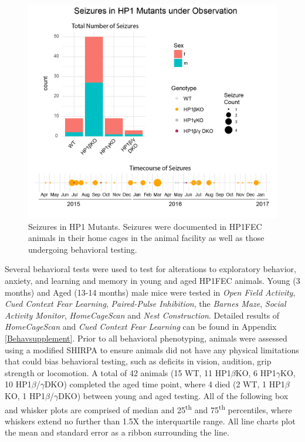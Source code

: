 \documentclass[onehalf,12pt]{beavtex}
\begin{document}
  \begin{figure}
  
  {\centering \includegraphics[width=1\linewidth, ]{./figure/results/seizures} 
  
  }
  
  \caption[Seizures in HP1 Mutants]{Seizures in HP1 Mutants.  Seizures were documented in HP1FEC animals in their home cages in the animal facility as well as those undergoing behavioral testing. }\label{fig:seizures}
  \end{figure}
  
  Several behavioral tests were used to test for alterations to
  exploratory behavior, anxiety, and learning and memory in young and aged
  HP1FEC animals. Young (3 months) and Aged (13-14 months) male mice were
  tested in \emph{Open Field Activity}, \emph{Cued Context Fear Learning},
  \emph{Paired-Pulse Inhibition}, the \emph{Barnes Maze}, \emph{Social
  Activity Monitor}, \emph{HomeCageScan} and \emph{Nest Construction}.
  Detailed results of \emph{HomeCageScan} and \emph{Cued Context Fear
  Learning} can be found in Appendix \ref{Behavsupplement}. Prior to all
  behavioral phenotyping, animals were assessed using a modified SHIRPA to
  ensure animals did not have any physical limitations that could bias
  behavioral testing, such as deficits in vision, audition, grip strength
  or locomotion. A total of 42 animals (15 WT, 11 HP1\(\beta\)KO, 6
  HP1\(\gamma\)KO, 10 HP1\(\beta\)/\(\gamma\)DKO) completed the aged time
  point, where 4 died (2 WT, 1 HP1\(\beta\)KO, 1
  HP1\(\beta\)/\(\gamma\)DKO) between young and aged testing. All of the
  following box and whisker plots are comprised of median and
  25\textsuperscript{th} and 75\textsuperscript{th} percentiles, where
  whiskers extend no further than 1.5X the interquartile range. All line
  charts plot the mean and standard error as a ribbon surrounding the
  line.
  
\end{document}
